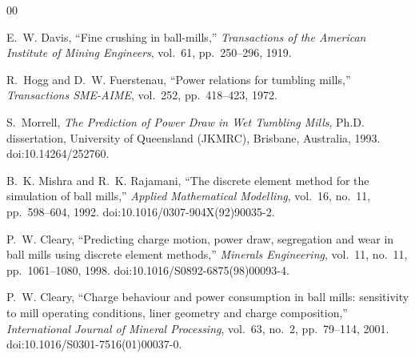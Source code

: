 \documentclass[journal]{IEEEtran}
\begin{document}
\begin{thebibliography}{00}

 E.~W. Davis, ``Fine crushing in ball-mills,'' \emph{Transactions of the American Institute of
Mining Engineers}, vol.~61, pp.~250--296, 1919.

 R.~Hogg and D.~W. Fuerstenau, ``Power relations for tumbling mills,'' \emph{Transactions
SME-AIME}, vol.~252, pp.~418--423, 1972.

 S.~Morrell, \emph{The Prediction of Power Draw in Wet Tumbling Mills}, Ph.D. dissertation,
University of Queensland (JKMRC), Brisbane, Australia, 1993. doi:10.14264/252760.

 B.~K. Mishra and R.~K. Rajamani, ``The discrete element method for the simulation of ball
mills,'' \emph{Applied Mathematical Modelling}, vol.~16, no.~11, pp.~598--604, 1992.
doi:10.1016/0307-904X(92)90035-2.

 P.~W. Cleary, ``Predicting charge motion, power draw, segregation and wear in ball mills using
discrete element methods,'' \emph{Minerals Engineering}, vol.~11, no.~11, pp.~1061--1080, 1998.
doi:10.1016/S0892-6875(98)00093-4.

 P.~W. Cleary, ``Charge behaviour and power consumption in ball mills: sensitivity to mill
operating conditions, liner geometry and charge composition,'' \emph{International Journal of Mineral
Processing}, vol.~63, no.~2, pp.~79--114, 2001. doi:10.1016/S0301-7516(01)00037-0.

\end{thebibliography}
\end{document}
